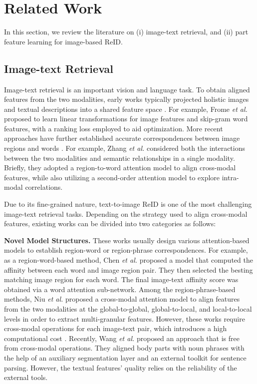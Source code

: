 \documentclass[journal]{IEEEtran}
\begin{document}
\section{Related Work} \label{related_work}
In this section, we review the literature on (i) image-text retrieval, and (ii) part feature learning for image-based ReID.

\subsection{Image-text Retrieval}
Image-text retrieval is an important vision and language task. To obtain aligned features from the two modalities, early works typically projected holistic images and textual descriptions into a shared feature space \cite{frome2013devise,wang2016learning,gu2018look,klein2015associating,yan2015deep}. For example, Frome \emph{et al.} \cite{frome2013devise} proposed to learn linear transformations for image features and skip-gram word features, with a ranking loss employed to aid optimization. More recent approaches have further established accurate correspondences between image regions and words \cite{chen2020imram,huang2018learning,lee2018stacked,niu2017hierarchical,zhang2020context,wei2020multi,liu2020graph,wang2019camp}. For example, Zhang \emph{et al.} \cite{zhang2020context} considered both the interactions between the two modalities and semantic relationships in a single modality. Briefly, they adopted a region-to-word attention model to align cross-modal features, while also utilizing a second-order attention model to explore intra-modal correlations.

Due to its fine-grained nature, text-to-image ReID is one of the most challenging image-text retrieval tasks. Depending on the strategy used to align cross-modal features, existing works can be divided into two categories as follows:

\textbf{Novel Model Structures.} These works usually design various attention-based models to establish region-word \cite{li2017person,li2017identity,chen2018improving} or region-phrase \cite{jing2020pose,niu2020improving} correspondences. For example, as a region-word-based method, Chen \emph{et al.} \cite{chen2018improving} proposed a model that computed the affinity between each word and image region pair. They then selected the besting matching image region for each word. The final image-text affinity score was obtained via a word attention sub-network. Among the region-phrase-based methods, Niu \emph{et al.} \cite{niu2020improving} proposed a cross-modal attention model to align features from the two modalities at the global-to-global, global-to-local, and local-to-local levels in order to extract multi-granular features. However, these works require cross-modal operations for each image-text pair, which introduces a high computational cost \cite{qu2020context}. Recently, Wang \emph{et al.} \cite{wang2020vitaa} proposed an approach that is free from cross-modal operations. They aligned body parts with noun phrases with the help of an auxiliary segmentation layer and an external toolkit for sentence parsing. However, the textual features' quality relies on the reliability of the external tools.
\end{document}
